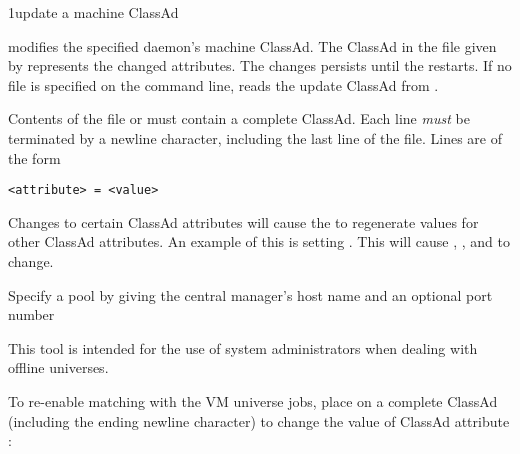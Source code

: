 \begin{ManPage}{}{1}{update a machine ClassAd}
\label{man-condor-update-machine-ad}

\Synopsis {}
\ToolArgsBase


\Description
{} modifies the specified 
daemon's machine ClassAd.
The ClassAd in the file given by 
represents the changed attributes.
The changes persists until the  restarts.
If no file is specified on the command line, 
reads the update ClassAd from .

Contents of the file or  must contain a complete
ClassAd.
Each line \emph{must} be terminated by a newline character,
including the last line of the file.
Lines are of the form

\begin{verbatim}
<attribute> = <value>
\end{verbatim}

Changes to certain ClassAd attributes will cause the 
 to regenerate values for other ClassAd attributes.
An example of this is setting .
This will cause ,
, and  to change.

\begin{Options}
    {Specify a pool by giving the
     central manager's host name and an optional port number}
\end{Options}

\GenRem

This tool is intended for the use of system administrators when dealing
with offline universes.  

\Examples

To re-enable matching with the VM universe jobs,
place on  a complete
ClassAd (including the ending newline character) to
change the value of ClassAd attribute :


\end{ManPage}
